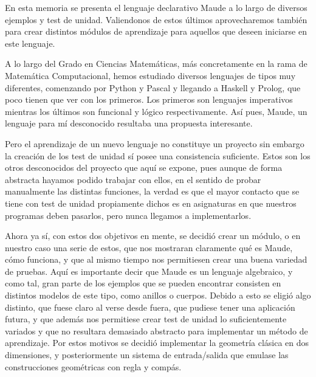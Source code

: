 
En esta memoria se presenta el lenguaje declarativo Maude a lo largo de diversos ejemplos y test de unidad. Valiendonos de estos últimos aprovecharemos también para crear distintos módulos de aprendizaje para aquellos que deseen iniciarse en este lenguaje.\par

A lo largo del Grado en Ciencias Matemáticas, más concretamente en la rama de Matemática Computacional, hemos estudiado diversos lenguajes de tipos muy diferentes, comenzando por Python y Pascal y llegando a Haskell y Prolog, que poco tienen que ver con los primeros. Los primeros son lenguajes imperativos mientras los últimos son funcional y lógico respectivamente. Así pues, Maude, un lenguaje para mí desconocido resultaba una propuesta interesante.\par

Pero el aprendizaje de un nuevo lenguaje no constituye un proyecto sin embargo la creación de los test de unidad sí posee una consistencia suficiente. Estos son los otros desconocidos del proyecto que aquí se expone, pues aunque de forma abstracta hayamos podido trabajar con ellos, en el sentido de probar manualmente las distintas funciones, la verdad es que el mayor contacto que se tiene con test de unidad propiamente dichos es en asignaturas en que nuestros programas deben pasarlos, pero nunca llegamos a implementarlos. \par

Ahora ya sí, con estos dos objetivos en mente, se decidió crear un módulo, o en nuestro caso una serie de estos, que nos mostraran claramente qué es Maude, cómo funciona, y que al mismo tiempo nos permitiesen crear una buena variedad de pruebas. Aquí es importante decir que Maude es un lenguaje algebraico, y como tal, gran parte de los ejemplos que se pueden encontrar consisten en distintos modelos de este tipo, como anillos o cuerpos. Debido a esto se eligió algo distinto, que fuese claro al verse desde fuera, que pudiese tener una aplicación futura, y que además nos permitiese crear test de unidad lo suficientemente variados y que no resultara demasiado abstracto para implementar un método de aprendizaje. Por estos motivos se decidió implementar la geometría clásica en dos dimensiones, y posteriormente un sistema de entrada/salida que emulase las construcciones geométricas con regla y compás. \par

